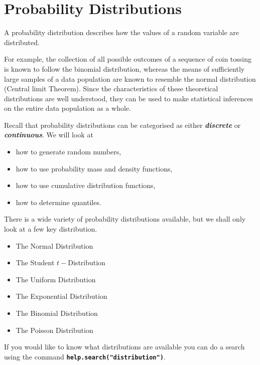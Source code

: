\documentclass[a4paper,12pt]{article}
\begin{document}
\section{Probability Distributions}
A probability distribution describes how the values of a random variable are distributed. 

For example, the collection of all possible outcomes of a sequence of coin tossing is known to follow the binomial distribution, whereas the means of sufficiently large samples of a data population are known to resemble the normal distribution (Central limit Theorem). Since the characteristics of these theoretical distributions are well understood, they can be used to make statistical inferences on the entire data population as a whole.

Recall that probability distributions can be categorised as either \textit{\textbf{discrete}} or \textit{\textbf{continuous}}.
We will look at  
\begin{itemize}
\item how to generate random numbers,
\item how to use probability mass and density functions,
\item how to use cumulative distribution functions,
\item how to determine quantiles.
\end{itemize} 

There is a wide variety of probability distributions available, but we shall only look at a few key distribution. 

\begin{itemize}
\item	The Normal Distribution
\item	The Student $t-$Distribution
\item   The Uniform Distribution
\item	The Exponential Distribution
\item	The Binomial Distribution
\item	The Poisson Distribution
\end{itemize}

If you would like to know what distributions are available you can do a search using the command \texttt{\textbf{help.search("distribution")}}. 

\end{document}
